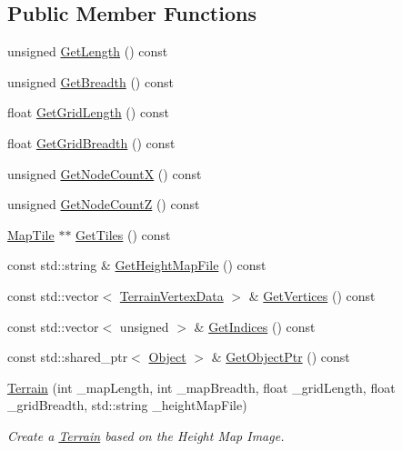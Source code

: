\subsection*{Public Member Functions}
\begin{DoxyCompactItemize}
\item 
unsigned \mbox{\hyperlink{classpiolot_1_1_terrain_aeb2f5954d70bc27d7dc84ab15180c502}{Get\+Length}} () const
\item 
unsigned \mbox{\hyperlink{classpiolot_1_1_terrain_a7fa4bf450e2545dbce46a870caa31aa2}{Get\+Breadth}} () const
\item 
float \mbox{\hyperlink{classpiolot_1_1_terrain_aa742fdf411184356e962f98d3785ec7c}{Get\+Grid\+Length}} () const
\item 
float \mbox{\hyperlink{classpiolot_1_1_terrain_acd20433446ca1eef57b1498e26aa0aca}{Get\+Grid\+Breadth}} () const
\item 
unsigned \mbox{\hyperlink{classpiolot_1_1_terrain_a284fb2b373798b73d3893837cfe5d4bc}{Get\+Node\+CountX}} () const
\item 
unsigned \mbox{\hyperlink{classpiolot_1_1_terrain_aef96f5a95563a88c641fbfd299c905f3}{Get\+Node\+CountZ}} () const
\item 
\mbox{\hyperlink{classpiolot_1_1_map_tile}{Map\+Tile}} $\ast$$\ast$ \mbox{\hyperlink{classpiolot_1_1_terrain_a0366991939da62e46bff441c1b3988e0}{Get\+Tiles}} () const
\item 
const std\+::string \& \mbox{\hyperlink{classpiolot_1_1_terrain_a8ce0f148b1b05889f609796d09840543}{Get\+Height\+Map\+File}} () const
\item 
const std\+::vector$<$ \mbox{\hyperlink{structpiolot_1_1_terrain_vertex_data}{Terrain\+Vertex\+Data}} $>$ \& \mbox{\hyperlink{classpiolot_1_1_terrain_a0fe5987e17e76c418cc9407a1acdc915}{Get\+Vertices}} () const
\item 
const std\+::vector$<$ unsigned $>$ \& \mbox{\hyperlink{classpiolot_1_1_terrain_ada8caf451e4946153d9a0cc4d5d0fcaf}{Get\+Indices}} () const
\item 
const std\+::shared\+\_\+ptr$<$ \mbox{\hyperlink{classpiolot_1_1_object}{Object}} $>$ \& \mbox{\hyperlink{classpiolot_1_1_terrain_a445ca2537de1765c3ae2c8073db1603f}{Get\+Object\+Ptr}} () const
\item 
\mbox{\hyperlink{classpiolot_1_1_terrain_aa60d6ba8d6dd4affb441d15eda4ca0f8}{Terrain}} (int \+\_\+map\+Length, int \+\_\+map\+Breadth, float \+\_\+grid\+Length, float \+\_\+grid\+Breadth, std\+::string \+\_\+height\+Map\+File)
\begin{DoxyCompactList}\small\item\em Create a \mbox{\hyperlink{classpiolot_1_1_terrain}{Terrain}} based on the Height Map Image. \end{DoxyCompactList}\item 
$$
\end{DoxyCompactItemize}
